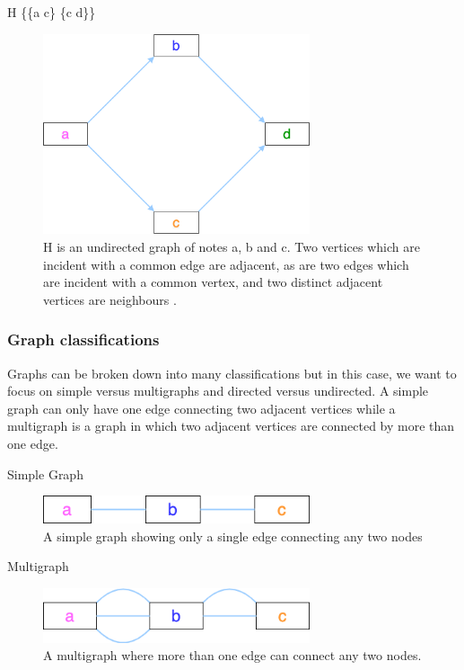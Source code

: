 \documentclass[10pt, a4paper]{article}
\begin{document}
H \{\{a c\} \{c d\}\}
\begin{figure}
\centering
\includegraphics[width=0.7\textwidth]{figures/Graph-classifications-Digraph.png}
\caption{\label{fig:orgd51fa8f}
H is an undirected graph of notes a, b and c. Two vertices which are incident with a common edge are adjacent, as are two edges which are incident with a common vertex, and two distinct adjacent vertices are neighbours \cite{bondyGraphTheory2011}.}
\end{figure}


\subsubsection{Graph classifications}
\label{sec:org0108d2f}
Graphs can be broken down into many classifications but in this case, we want to
focus on simple versus multigraphs and directed versus undirected.
A simple graph can only have one edge connecting two adjacent vertices while a
multigraph is a graph in which two adjacent vertices are connected by more than
one edge.

Simple Graph
\begin{figure}
\centering
\includegraphics[width=0.7\textwidth]{figures/Graph-classifications-Simple-Graph.png}
\caption{\label{fig:orgb1489c7}
A simple graph showing only a single edge connecting any two nodes}
\end{figure}


Multigraph
\begin{figure}
\centering
\includegraphics[width=0.7\textwidth]{figures/Graph-classifications-Multigraph.png}
\caption{\label{fig:org63299a2}
A multigraph where more than one edge can connect any two nodes.}
\end{figure}
\end{document}
